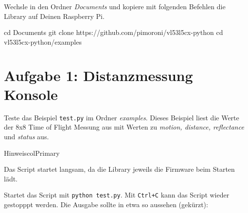 \documentclass[
  11pt,
  a4paperpaper,
  oneside, openany  ,captions=tableheading
]{scrbook}
\newenvironment{Shaded}{\begin{snugshade}}{\end{snugshade}}
\newcommand{\BuiltInTok}[1]{\textcolor[rgb]{0.00,0.23,0.31}{#1}}
\newcommand{\FunctionTok}[1]{\textcolor[rgb]{0.28,0.35,0.67}{#1}}
\newcommand{\NormalTok}[1]{\textcolor[rgb]{0.00,0.23,0.31}{#1}}
\theoremstyle{definition}
\theoremstyle{remark}
\begin{document}
Wechsle in den Ordner \emph{Documents} und kopiere mit folgenden
Befehlen die Library auf Deinen Raspberry Pi.

\begin{Shaded}
\begin{Highlighting}[]
\BuiltInTok{cd}\NormalTok{ Documents}
\FunctionTok{git}\NormalTok{ clone https://github.com/pimoroni/vl53l5cx{-}python}
\BuiltInTok{cd}\NormalTok{ vl53l5cx{-}python/examples}
\end{Highlighting}
\end{Shaded}

\section{Aufgabe 1: Distanzmessung
Konsole}\label{aufgabe-1-distanzmessung-konsole}

Teste das Beispiel \texttt{test.py} im Ordner \emph{examples}. Dieses
Beispiel liest die Werte der 8x8 Time of Flight Messung aus mit Werten
zu \emph{motion, distance, reflectance} und \emph{status} aus.

\begin{boxtitle}{Hinweis}{colPrimary}

Das Script startet langsam, da die Library jeweils die Firmware beim
Starten lädt.

\end{boxtitle}

Startet das Script mit \texttt{python\ test.py}. Mit \texttt{Ctrl+C}
kann das Script wieder gestopppt werden. Die Ausgabe sollte in etwa so
aussehen (gekürzt):
\end{document}
